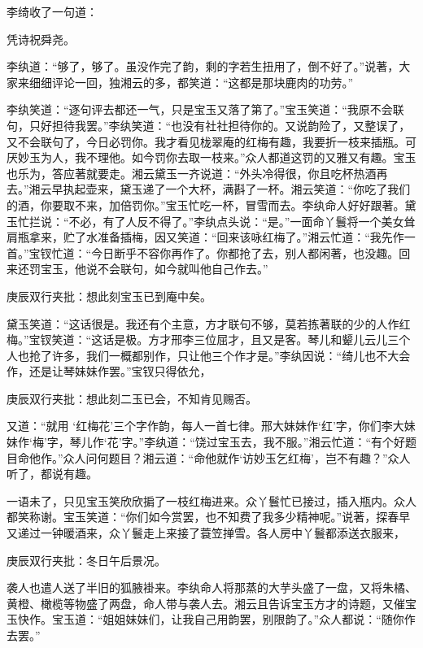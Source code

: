 \begin{parag}
    李绮收了一句道：
\end{parag}
\begin{poem}
    \begin{pl} 凭诗祝舜尧。\end{pl}
\end{poem}


\begin{parag}
    李纨道：“够了，够了。虽没作完了韵，剩的字若生扭用了，倒不好了。”说著，大家来细细评论一回，独湘云的多，都笑道：“这都是那块鹿肉的功劳。”
\end{parag}


\begin{parag}
    李纨笑道：“逐句评去都还一气，只是宝玉又落了第了。”宝玉笑道：“我原不会联句，只好担待我罢。”李纨笑道：“也没有社社担待你的。又说韵险了，又整误了，又不会联句了，今日必罚你。我才看见栊翠庵的红梅有趣，我要折一枝来插瓶。可厌妙玉为人，我不理他。如今罚你去取一枝来。”众人都道这罚的又雅又有趣。宝玉也乐为，答应著就要走。湘云黛玉一齐说道：“外头冷得很，你且吃杯热酒再去。”湘云早执起壶来，黛玉递了一个大杯，满斟了一杯。湘云笑道：“你吃了我们的酒，你要取不来，加倍罚你。”宝玉忙吃一杯，冒雪而去。李纨命人好好跟著。黛玉忙拦说：“不必，有了人反不得了。”李纨点头说：“是。”一面命丫鬟将一个美女耸肩瓶拿来，贮了水准备插梅，因又笑道：“回来该咏红梅了。”湘云忙道：“我先作一首。”宝钗忙道：“今日断乎不容你再作了。你都抢了去，别人都闲著，也没趣。回来还罚宝玉，他说不会联句，如今就叫他自己作去。”\begin{note}庚辰双行夹批：想此刻宝玉已到庵中矣。\end{note}黛玉笑道：“这话很是。我还有个主意，方才联句不够，莫若拣著联的少的人作红梅。”宝钗笑道：“这话是极。方才邢李三位屈才，且又是客。琴儿和颦儿云儿三个人也抢了许多，我们一概都别作，只让他三个作才是。”李纨因说：“绮儿也不大会作，还是让琴妹妹作罢。”宝钗只得依允，\begin{note}庚辰双行夹批：想此刻二玉已会，不知肯见赐否。\end{note}又道：“就用 ‘红梅花’三个字作韵，每人一首七律。邢大妹妹作‘红’字，你们李大妹妹作‘梅’字，琴儿作‘花’字。”李纨道：“饶过宝玉去，我不服。”湘云忙道：“有个好题目命他作。”众人问何题目？湘云道：“命他就作‘访妙玉乞红梅’，岂不有趣？”众人听了，都说有趣。
\end{parag}


\begin{parag}
    一语未了，只见宝玉笑欣欣掮了一枝红梅进来。众丫鬟忙已接过，插入瓶内。众人都笑称谢。宝玉笑道：“你们如今赏罢，也不知费了我多少精神呢。”说著，探春早又递过一钟暖酒来，众丫鬟走上来接了蓑笠掸雪。各人房中丫鬟都添送衣服来，\begin{note}庚辰双行夹批：冬日午后景况。\end{note}袭人也遣人送了半旧的狐腋褂来。李纨命人将那蒸的大芋头盛了一盘，又将朱橘、黄橙、橄榄等物盛了两盘，命人带与袭人去。湘云且告诉宝玉方才的诗题，又催宝玉快作。宝玉道：“姐姐妹妹们，让我自己用韵罢，别限韵了。”众人都说：“随你作去罢。”
\end{parag}


